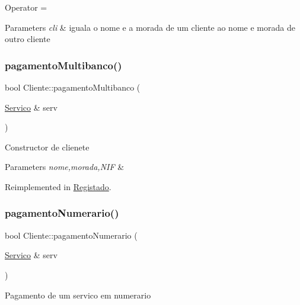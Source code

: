 Operator =


\begin{DoxyParams}{Parameters}
{\em cli} & iguala o nome e a morada de um cliente ao nome e morada de outro cliente \\
\hline
\end{DoxyParams}
\mbox{\label{class_cliente_a6e230e5e512bebe07bfa1ad6750b8cee}} 
\subsubsection{\texorpdfstring{pagamento\+Multibanco()}{pagamentoMultibanco()}}
{\footnotesize\ttfamily bool Cliente\+::pagamento\+Multibanco (\begin{DoxyParamCaption}\item[{\hyperlink{class_servico}{Servico} \&}]{serv }\end{DoxyParamCaption})\hspace{0.3cm}{\ttfamily [virtual]}}

Constructor de clienete 
\begin{DoxyParams}{Parameters}
{\em nome,morada,N\+IF} & \\
\hline
\end{DoxyParams}


Reimplemented in \hyperlink{class_registado_a36be4ccf8e4b1bc26be7c1c2d4612229}{Registado}.

\mbox{\label{class_cliente_a68646846a80de5cdcb61b1f8a13e4fb8}} 
\subsubsection{\texorpdfstring{pagamento\+Numerario()}{pagamentoNumerario()}}
{\footnotesize\ttfamily bool Cliente\+::pagamento\+Numerario (\begin{DoxyParamCaption}\item[{\hyperlink{class_servico}{Servico} \&}]{serv }\end{DoxyParamCaption})\hspace{0.3cm}{\ttfamily [virtual]}}

Pagamento de um servico em numerario


